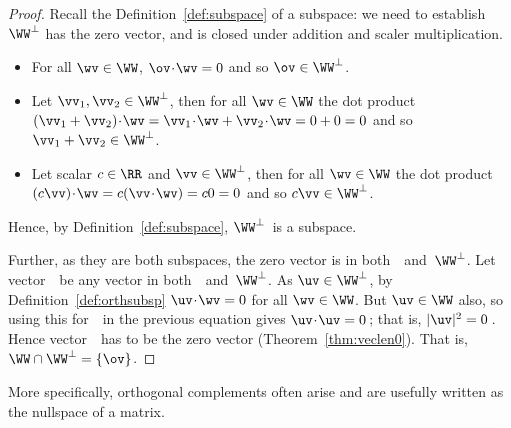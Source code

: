 \begin{proof} 
Recall the Definition~\ref{def:subspace} of a subspace: we need to establish \(\WW^\perp\) has the zero vector, and is closed under addition and scaler multiplication.
\begin{itemize}
\item For all \(\wv\in\WW\), \(\ov\cdot\wv=0\) and so \(\ov\in\WW^\perp\).
\item Let \(\vv_1,\vv_2\in\WW^\perp\), then for all \(\wv\in\WW\) the dot product  \((\vv_1+\vv_2)\cdot\wv=\vv_1\cdot\wv+\vv_2\cdot\wv=0+0=0\) and so \(\vv_1+\vv_2\in\WW^\perp\).
\item Let scalar \(c\in\RR\) and \(\vv\in\WW^\perp\), then for all \(\wv\in\WW\) the dot product  \((c\vv)\cdot\wv=c(\vv\cdot\wv)=c0=0\) and so \(c\vv\in\WW^\perp\).
\end{itemize}
Hence, by Definition~\ref{def:subspace}, \(\WW^\perp\)~is a subspace.

Further, as they are both subspaces, the zero vector is in both~\WW\ and~\(\WW^\perp\).
Let vector~\uv\ be any vector in both~\WW\ and~\(\WW^\perp\).
As \(\uv\in\WW^\perp\), by Definition~\ref{def:orthsubsp} \(\uv\cdot\wv=0\) for all \(\wv\in\WW\).
But \(\uv\in\WW\) also, so using this for~\wv\ in the previous equation gives \(\uv\cdot\uv=0\)\,; that is, \(|\uv|^2=0\)\,.
Hence vector~\uv\ has to be the zero vector (Theorem~\ref{thm:veclen0}).
That is, \(\WW\cap\WW^\perp=\{\ov\}\).
\end{proof}

More specifically, orthogonal complements often arise and are usefully written as the nullspace of a matrix.


